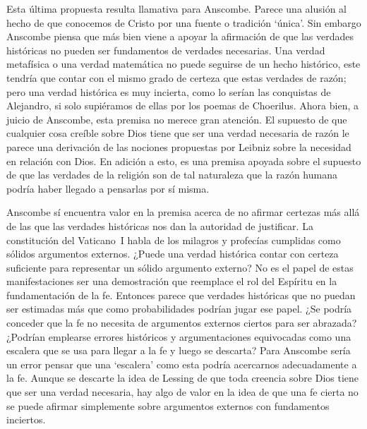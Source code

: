 Esta última propuesta resulta llamativa para Anscombe. Parece una alusión al hecho de que conocemos de Cristo por una fuente o tradición `única'. Sin embargo Anscombe piensa que más bien viene a apoyar la afirmación de que las verdades históricas no pueden ser fundamentos de verdades necesarias. Una verdad metafísica o una verdad matemática no puede seguirse de un hecho histórico, este tendría que contar con el mismo grado de certeza que estas verdades de razón; pero una verdad histórica es muy incierta, como lo serían las conquistas de Alejandro, si solo supiéramos de ellas por los poemas de Choerilus. Ahora bien, a juicio de Anscombe, esta premisa no merece gran atención. El supuesto de que cualquier cosa creíble sobre Dios tiene que ser una verdad necesaria de razón le parece una derivación de las nociones propuestas por Leibniz sobre la necesidad en relación con Dios. En adición a esto, es una premisa apoyada sobre el supuesto de que las verdades de la religión son de tal naturaleza que la razón humana podría haber llegado a pensarlas por sí misma.

Anscombe sí encuentra valor en la premisa acerca de no afirmar certezas más allá de las que las verdades históricas nos dan la autoridad de justificar. La constitución del Vaticano~I habla de los milagros y profecías cumplidas como sólidos argumentos externos. ¿Puede una verdad histórica contar con certeza suficiente para representar un sólido argumento externo? No es el papel de estas manifestaciones ser una demostración que reemplace el rol del Espíritu en la fundamentación de la fe. Entonces parece que verdades históricas que no puedan ser estimadas más que como probabilidades podrían jugar ese papel. ¿Se podría conceder que la fe no necesita de argumentos externos ciertos para ser abrazada? ¿Podrían emplearse errores históricos y argumentaciones equivocadas como una escalera que se usa para llegar a la fe y luego se descarta? Para Anscombe sería un error pensar que una `escalera' como esta podría acercarnos adecuadamente a la fe. Aunque se descarte la idea de Lessing de que toda creencia sobre Dios tiene que ser una verdad necesaria, hay algo de valor en la idea de que una fe cierta no se puede afirmar simplemente sobre argumentos externos con fundamentos inciertos.

